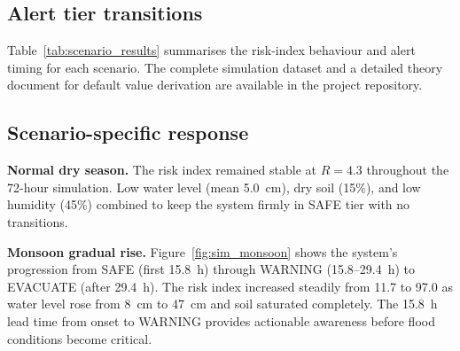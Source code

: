 \documentclass[5p,twocolumn]{elsarticle}
\begin{document}
\subsection{Alert tier transitions}

Table~\ref{tab:scenario_results} summarises the risk-index behaviour and alert timing for each scenario. The complete simulation dataset and a detailed theory document for default value derivation are available in the project repository.

\begin{table}[htbp]
  \caption{Simulation scenario results. Risk index range, peak risk, and alert transition times. SAFE at $R<40$, WARNING at $40\le R<75$, EVACUATE at $R\ge75$ with $\pm5$ hysteresis.}
  \label{tab:scenario_results}
  \centering
  \footnotesize
  \setlength{\tabcolsep}{2pt}
\end{table}

\subsection{Scenario-specific response}

\textbf{Normal dry season.} The risk index remained stable at $R=4.3$ throughout the 72-hour simulation. Low water level (mean 5.0~cm), dry soil (15\%), and low humidity (45\%) combined to keep the system firmly in SAFE tier with no transitions.

\textbf{Monsoon gradual rise.} Figure~\ref{fig:sim_monsoon} shows the system's progression from SAFE (first 15.8~h) through WARNING (15.8--29.4~h) to EVACUATE (after 29.4~h). The risk index increased steadily from 11.7 to 97.0 as water level rose from 8~cm to 47~cm and soil saturated completely. The 15.8~h lead time from onset to WARNING provides actionable awareness before flood conditions become critical.
\end{document}
